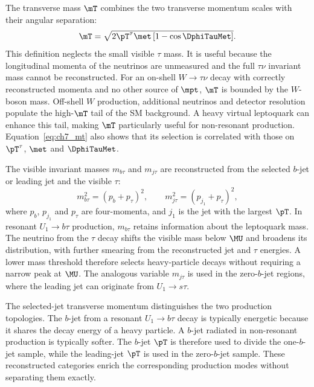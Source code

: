 The transverse mass $\mT$ combines the two transverse momentum scales with their angular separation:
    \begin{equation}
        \mT = \sqrt{2\pT^\tau\met\left[1-\cos\DphiTauMet\right]}.
        \label{eq:ch7_mt}
    \end{equation}
    This definition neglects the small visible $\tau$ mass.
    It is useful because the longitudinal momenta of the neutrinos are unmeasured and the full $\tau\nu$ invariant mass cannot be reconstructed.
    For an on-shell $W\to\tau\nu$ decay with correctly reconstructed momenta and no other source of $\mpt$, $\mT$ is bounded by the $W$-boson mass.
    Off-shell $W$ production, additional neutrinos and detector resolution populate the high-$\mT$ tail of the SM background.
    A heavy virtual leptoquark can enhance this tail, making $\mT$ particularly useful for non-resonant production.
    Equation~\ref{eq:ch7_mt} also shows that its selection is correlated with those on $\pT^\tau$, $\met$ and $\DphiTauMet$.

The visible invariant masses $m_{b\tau}$ and $m_{j\tau}$ are reconstructed from the selected $b$-jet or leading jet and the visible $\tau$:
    \begin{equation}
        m_{b\tau}^{2} = (p_b+p_\tau)^2, \qquad m_{j\tau}^{2} = (p_{j_1}+p_\tau)^2,
        \label{eq:ch7_visible_masses}
    \end{equation}
    where $p_b$, $p_{j_1}$ and $p_\tau$ are four-momenta, and $j_1$ is the jet with the largest $\pT$.
    In resonant $U_1\to b\tau$ production, $m_{b\tau}$ retains information about the leptoquark mass.
    The neutrino from the $\tau$ decay shifts the visible mass below $\MU$ and broadens its distribution, with further smearing from the reconstructed jet and $\tau$ energies.
    A lower mass threshold therefore selects heavy-particle decays without requiring a narrow peak at $\MU$.
    The analogous variable $m_{j\tau}$ is used in the zero-$b$-jet regions, where the leading jet can originate from $U_1\to s\tau$.

The selected-jet transverse momentum distinguishes the two production topologies.
    The $b$-jet from a resonant $U_1\to b\tau$ decay is typically energetic because it shares the decay energy of a heavy particle.
    A $b$-jet radiated in non-resonant production is typically softer.
    The $b$-jet $\pT$ is therefore used to divide the one-$b$-jet sample, while the leading-jet $\pT$ is used in the zero-$b$-jet sample.
    These reconstructed categories enrich the corresponding production modes without separating them exactly.

